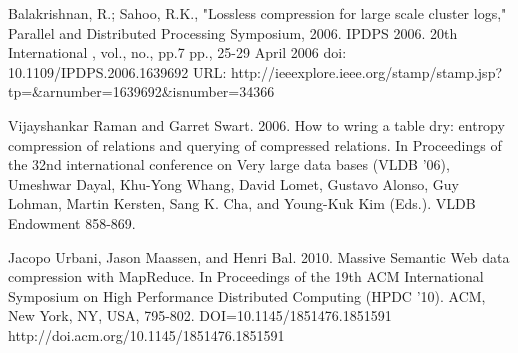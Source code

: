 \documentclass[twocolumn]{article}
\begin{document}
{\begin{thebibliography}{10}
	Balakrishnan, R.; Sahoo, R.K., "Lossless compression 
		for large scale cluster logs," Parallel and Distributed Processing 
		Symposium, 2006. IPDPS 2006. 20th International , vol., no., pp.7 pp., 
		25-29 April 2006 doi: 10.1109/IPDPS.2006.1639692
		URL: http://ieeexplore.ieee.org/stamp/stamp.jsp?tp=&arnumber=1639692&isnumber=34366

 Vijayshankar Raman and Garret Swart. 2006. How to 
		wring a table dry: entropy compression of relations and querying of 
		compressed relations. In Proceedings of the 32nd international conference 
		on Very large data bases (VLDB '06), Umeshwar Dayal, Khu-Yong Whang, 
		David Lomet, Gustavo Alonso, Guy Lohman, Martin Kersten, Sang K. Cha, 
		and Young-Kuk Kim (Eds.). VLDB Endowment 858-869.

 Jacopo Urbani, Jason Maassen, and Henri Bal. 2010. Massive 
		Semantic Web data compression with MapReduce. In Proceedings of the 19th 
		ACM International Symposium on High Performance Distributed Computing 
		(HPDC '10). ACM, New York, NY, USA, 795-802. DOI=10.1145/1851476.1851591 
	       	http://doi.acm.org/10.1145/1851476.1851591	


\end{thebibliography}
}
\end{document}
